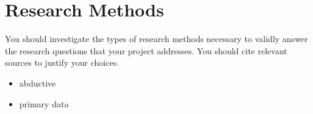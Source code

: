 \section{Research Methods}
You should investigate the types of research methods necessary to validly answer the research questions that your project addresses. You should cite relevant sources to justify your choices.
\begin{itemize}
    \item abductive
    \item primary data
    
\end{itemize}